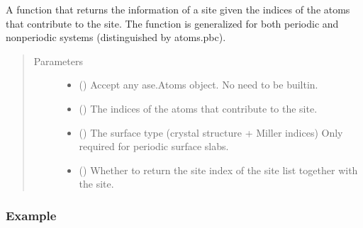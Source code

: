 \documentclass[letterpaper,10pt,english]{sphinxmanual}
\begin{document}
\begin{fulllineitems}
\label{\detokenize{modules:acat.adsorption_sites.get_adsorption_site}}
A function that returns the information of a site given the
indices of the atoms that contribute to the site. The function
is generalized for both periodic and non\sphinxhyphen{}periodic systems
(distinguished by atoms.pbc).
\begin{quote}\begin{description}
\item[{Parameters}] \leavevmode\begin{itemize}
\item {} 
 () \textendash{} Accept any ase.Atoms object. No need to be built\sphinxhyphen{}in.

\item {} 
 () \textendash{} The indices of the atoms that contribute to the site.

\item {} 
 (\sphinxstyleliteralemphasis{\sphinxupquote{, }}) \textendash{} The surface type (crystal structure + Miller indices)
Only required for periodic surface slabs.

\item {} 
 (\sphinxstyleliteralemphasis{\sphinxupquote{, }}) \textendash{} Whether to return the site index of the site list
together with the site.

\end{itemize}

\end{description}\end{quote}
\subsubsection*{Example}


\end{fulllineitems}
\end{document}
